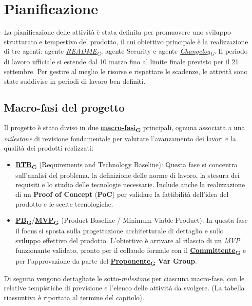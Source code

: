 \documentclass[12pt, a4paper]{article}
\newcommand{\urlglossario}{https://skynetunigroup.github.io/Code_Guardian/Documentazione/RTB/glossario_v1.0.0.pdf} %
\newcommand{\glo}[2]{\href{\urlglossario\#nameddest=#2}{#1\textsubscript{G}}}
\begin{document}
{\newpage
\section{Pianificazione}

La pianificazione delle attività è stata definita per promuovere uno sviluppo strutturato e tempestivo del prodotto, il cui obiettivo principale è la realizzazione di tre agenti: agente \textit{\glo{README}{readme}}, agente Security e agente \textit{\glo{Changelog}{changelog}}.
Il periodo di lavoro ufficiale si estende dal 10 marzo fino al limite finale previsto per il 21 settembre. Per gestire al meglio le risorse e rispettare le scadenze, le attività sono state suddivise in periodi di lavoro ben definiti.

\subsection{\textbf{Macro-fasi} del progetto}
Il progetto è stato diviso in due \textbf{\glo{macro-fasi}{macro-fasi}} principali, ognuna associata a una \textit{milestone} di revisione fondamentale per valutare l'avanzamento dei lavori e la qualità dei prodotti realizzati:

\begin{itemize}
    \item \textbf{\glo{RTB}{rtb}} (Requirements and Technology Baseline): Questa fase si concentra sull'analisi del problema, la definizione delle norme di lavoro, la stesura dei requisiti e lo studio delle tecnologie necessarie.
Include anche la realizzazione di un \textbf{Proof of Concept} (\textbf{PoC}) per validare la fattibilità dell'idea del prodotto e le scelte tecnologiche.
\item \textbf{\glo{PB}{pb}}/\textbf{\glo{MVP}{mvp}} (Product Baseline / Minimum Viable Product): In questa fase il focus si sposta sulla progettazione architetturale di dettaglio e sullo sviluppo effettivo del prodotto.
L'obiettivo è arrivare al rilascio di un \textit{MVP} funzionante validato, pronto per il collaudo formale con il \textbf{\glo{Committente}{committente}} e per l'approvazione da parte del \textbf{\glo{Proponente}{proponente} Var Group}.
\end{itemize}

Di seguito vengono dettagliate le sotto-\textit{milestone} per ciascuna macro-fase, con le relative tempistiche di previsione e l'elenco delle attività da svolgere.
(La tabella riassuntiva è riportata al termine del capitolo).

}
\end{document}
